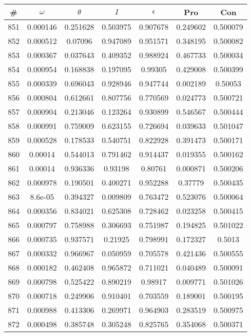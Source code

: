 \newpage
\begin{table}
\begin{tabular}{c|c|c|c|c|c|c}
\# & $\omega$ & $\theta$ & $I$ & $\epsilon$ & Pro & Con\\
\hline
851 & 0.000146 & 0.251628 & 0.503975 & 0.907678 & 0.249602 & 0.500079\\
852 & 0.000512 & 0.07096 & 0.947089 & 0.951571 & 0.348195 & 0.500082\\
853 & 0.000367 & 0.037643 & 0.409352 & 0.988924 & 0.467733 & 0.500034\\
854 & 0.000954 & 0.168838 & 0.197095 & 0.99305 & 0.429008 & 0.500399\\
855 & 0.000339 & 0.696043 & 0.928946 & 0.947744 & 0.002189 & 0.50053\\
856 & 0.000804 & 0.612661 & 0.807756 & 0.770569 & 0.024773 & 0.500721\\
857 & 0.000904 & 0.213046 & 0.123264 & 0.930899 & 0.546567 & 0.500444\\
858 & 0.000991 & 0.759009 & 0.623155 & 0.726694 & 0.039633 & 0.501047\\
859 & 0.000528 & 0.178533 & 0.540751 & 0.822928 & 0.391473 & 0.500171\\
860 & 0.00014 & 0.544013 & 0.791462 & 0.914437 & 0.019355 & 0.500162\\
861 & 0.00014 & 0.936336 & 0.93198 & 0.80761 & 0.000871 & 0.500206\\
862 & 0.000978 & 0.190501 & 0.400271 & 0.952288 & 0.37779 & 0.500435\\
863 & 8.6e-05 & 0.394327 & 0.009809 & 0.763472 & 0.523076 & 0.500064\\
864 & 0.000356 & 0.834021 & 0.625308 & 0.728462 & 0.023258 & 0.500415\\
865 & 0.000797 & 0.758988 & 0.306693 & 0.751987 & 0.194825 & 0.501022\\
866 & 0.000735 & 0.937571 & 0.21925 & 0.798991 & 0.172327 & 0.5013\\
867 & 0.000332 & 0.966967 & 0.050959 & 0.705578 & 0.421436 & 0.500555\\
868 & 0.000182 & 0.462408 & 0.965872 & 0.711021 & 0.040489 & 0.500091\\
869 & 0.000798 & 0.525422 & 0.890219 & 0.98917 & 0.009771 & 0.501026\\
870 & 0.000718 & 0.249906 & 0.910401 & 0.703559 & 0.189001 & 0.500195\\
871 & 0.000988 & 0.413306 & 0.269971 & 0.964903 & 0.283519 & 0.500975\\
872 & 0.000498 & 0.385748 & 0.305248 & 0.825765 & 0.354068 & 0.500371\\

\end{tabular}
\end{table}
